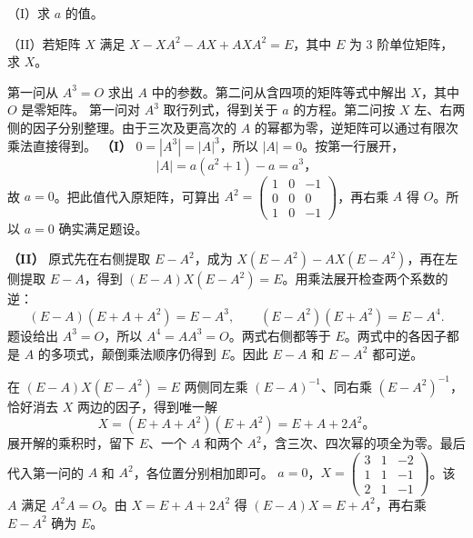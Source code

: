 \documentclass[UTF8,zihao=-4,fontset=fandol]{ctexart}
\begin{document}
（I）求 $a$ 的值。

（II）若矩阵 $X$ 满足 $X-XA^2-AX+AXA^2=E$，其中 $E$ 为 $3$ 阶单位矩阵，求 $X$。

\Solution
\Known 第一问从 $A^3=O$ 求出 $A$ 中的参数。第二问从含四项的矩阵等式中解出 $X$，其中 $O$ 是零矩阵。
\Method 第一问对 $A^3$ 取行列式，得到关于 $a$ 的方程。第二问按 $X$ 左、右两侧的因子分别整理。由于三次及更高次的 $A$ 的幂都为零，逆矩阵可以通过有限次乘法直接得到。
\Derive \textbf{（I）} $0=|A^3|=|A|^3$，所以 $|A|=0$。按第一行展开，
\[
|A|=a(a^2+1)-a=a^3\text{，}
\]
故 $a=0$。把此值代入原矩阵，可算出 $A^2=\begin{pmatrix}1&0&-1\\0&0&0\\1&0&-1\end{pmatrix}$，再右乘 $A$ 得 $O$。所以 $a=0$ 确实满足题设。

\textbf{（II）} 原式先在右侧提取 $E-A^2$，成为 $X(E-A^2)-AX(E-A^2)$，再在左侧提取 $E-A$，得到 $(E-A)X(E-A^2)=E$。用乘法展开检查两个系数的逆：
\[
(E-A)(E+A+A^2)=E-A^3,\qquad
(E-A^2)(E+A^2)=E-A^4.
\]
题设给出 $A^3=O$，所以 $A^4=AA^3=O$。两式右侧都等于 $E$。两式中的各因子都是 $A$ 的多项式，颠倒乘法顺序仍得到 $E$。因此 $E-A$ 和 $E-A^2$ 都可逆。
\SolutionContinued

在 $(E-A)X(E-A^2)=E$ 两侧同左乘 $(E-A)^{-1}$、同右乘 $(E-A^2)^{-1}$，恰好消去 $X$ 两边的因子，得到唯一解
\[
X=(E+A+A^2)(E+A^2)=E+A+2A^2\text{。}
\]
展开解的乘积时，留下 $E$、一个 $A$ 和两个 $A^2$，含三次、四次幂的项全为零。最后代入第一问的 $A$ 和 $A^2$，各位置分别相加即可。
\Verify $a=0$，$X=\begin{pmatrix}3&1&-2\\1&1&-1\\2&1&-1\end{pmatrix}$。该 $A$ 满足 $A^2A=O$。由 $X=E+A+2A^2$ 得 $(E-A)X=E+A^2$，再右乘 $E-A^2$ 确为 $E$。
\end{document}
